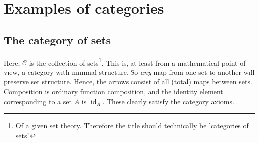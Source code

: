 \documentclass[12pt, a4paper]{article}
\numberwithin{equation}{section}
\DeclareMathOperator{\id}{id}
\begin{document}
\section{Examples of categories}

\subsection{The category of sets}
Here, $\mathcal{C}$ is the collection of sets\footnote{Of a given set theory. Therefore the title should technically be 'categories of sets'.}. This is, at least from a mathematical point of view, a category with minimal structure. So \textit{any} map from one set to another will preserve set structure. Hence, the arrows consist of all (total) maps between sets. Composition is ordinary function composition, and the identity element corresponding to a set $A$ is $\id_A$. These clearly satisfy the category axioms.
\end{document}

